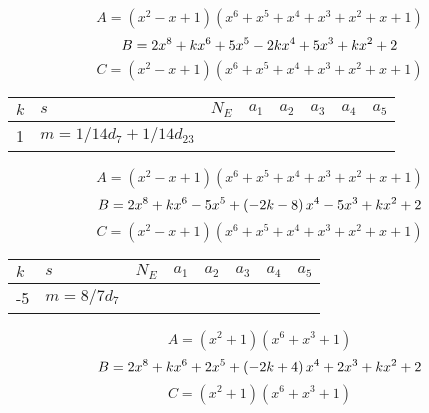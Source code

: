 \documentclass{amsart}
\begin{document}
$$A=(x^2
 - x
 + 1)(x^6
 + x^5
 + x^4
 + x^3
 + x^2
 + x
 + 1)$$
$$B=2\*x^8
 + k\*x^6
 + 5\*x^5
 - 2\*k\*x^4
 + 5\*x^3
 + k\*x^2
 + 2$$
$$C=(x^2
 - x
 + 1)(x^6
 + x^5
 + x^4
 + x^3
 + x^2
 + x
 + 1)$$
\begin{longtable}{|l|l|l|lllll|}
\hline
$k$ & $s$ & $N_E$ & $a_1$ & $a_2$ & $a_3$ & $a_4$ & $a_5$\\
\hline
1&$m=1/14d_{7}+1/14d_{23}$&&\multicolumn{5}{c|}{}\\
\hline
\end{longtable}
$$A=(x^2
 - x
 + 1)(x^6
 + x^5
 + x^4
 + x^3
 + x^2
 + x
 + 1)$$
$$B=2\*x^8
 + k\*x^6
 - 5\*x^5
 + \left(-2\*k
 - 8\right) \*x^4
 - 5\*x^3
 + k\*x^2
 + 2$$
$$C=(x^2
 - x
 + 1)(x^6
 + x^5
 + x^4
 + x^3
 + x^2
 + x
 + 1)$$
\begin{longtable}{|l|l|l|lllll|}
\hline
$k$ & $s$ & $N_E$ & $a_1$ & $a_2$ & $a_3$ & $a_4$ & $a_5$\\
\hline
-5&$m=8/7d_{7}$&&\multicolumn{5}{c|}{}\\
\hline
\end{longtable}
$$A=(x^2
 + 1)(x^6
 + x^3
 + 1)$$
$$B=2\*x^8
 + k\*x^6
 + 2\*x^5
 + \left(-2\*k
 + 4\right) \*x^4
 + 2\*x^3
 + k\*x^2
 + 2$$
$$C=(x^2
 + 1)(x^6
 + x^3
 + 1)$$
\end{document}
